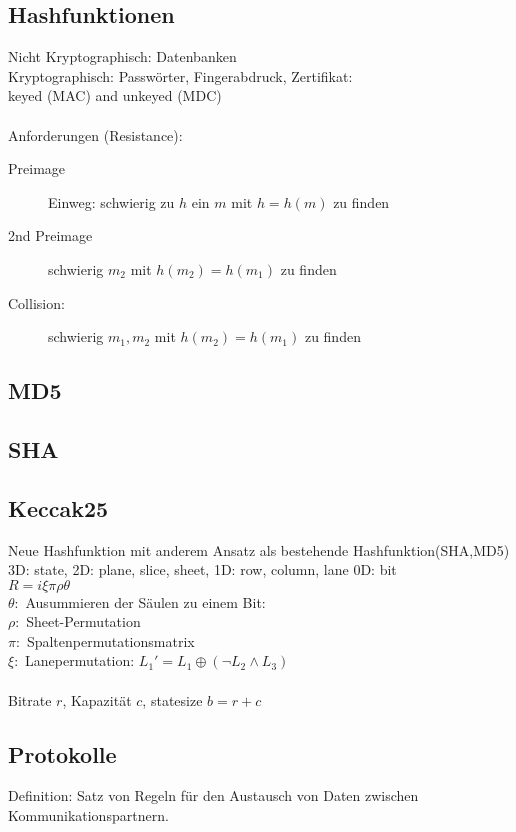 \documentclass[fs]{latex4ei}
\begin{document}
\begin{multicols}{4}
\section{Hashfunktionen}
Nicht Kryptographisch: Datenbanken\\
Kryptographisch: Passwörter, Fingerabdruck, Zertifikat:\\
	keyed (MAC) and unkeyed (MDC)\\
\\
Anforderungen (Resistance):
\begin{description}
	\item[Preimage] Einweg: schwierig zu $h$ ein $m$ mit $h = h(m)$ zu finden
	\item[2nd Preimage] schwierig $m_2$ mit $h(m_2) = h(m_1)$ zu finden
	\item[Collision:] schwierig $m_1,m_2$ mit $h(m_2) = h(m_1)$ zu finden
\end{description}

\subsection{MD5}


\subsection{SHA}


\subsection{Keccak25}
Neue Hashfunktion mit anderem Ansatz als bestehende Hashfunktion(SHA,MD5)\\
3D: state, 2D: plane, slice, sheet, 1D: row, column, lane 0D: bit\\
$R = i \xi \pi \rho \theta$\\
$\theta:$ Ausummieren der Säulen zu einem Bit:\\
$\rho:$ Sheet-Permutation\\
$\pi:$ Spaltenpermutationsmatrix \\
$\xi:$ Lanepermutation: $L_1' = L_{1} \oplus (\neg L_2 \land L_3)$\\
\\
Bitrate $r$, Kapazität $c$, statesize $b = r+c$





\subsection{Protokolle}
Definition: Satz von Regeln für den Austausch von Daten zwischen Kommunikationspartnern.\\


\end{multicols}
\end{document}
